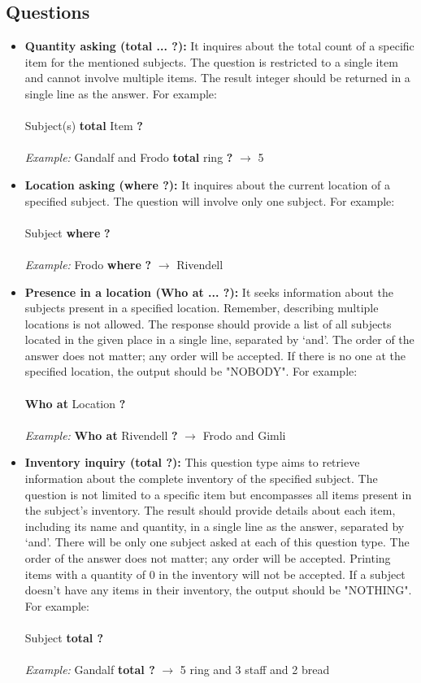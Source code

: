 \documentclass[12pt]{article}
\begin{document}
\subsection{Questions}
\begin{itemize}
    \item \textbf{Quantity asking (total ... ?):} It inquires about the total count of a specific item for the mentioned subjects. The question is restricted to a single item and cannot involve multiple items. The result integer should be returned in a single line as the answer. For example: \\\\
    Subject(s) \textbf{total} Item \textbf{?} \\\\ \textit{Example:} Gandalf and Frodo \textbf{total} ring \textbf{?} $\rightarrow$ 5 
    
\item \textbf{Location asking (where ?):} 
It inquires about the current location of a specified subject. The question will involve only one subject. For example: \\\\
Subject \textbf{where} \textbf{?} \\\\
\textit{Example:} Frodo \textbf{where} \textbf{?} $\rightarrow$ Rivendell 

\item \textbf{Presence in a location (Who at ... ?):} It seeks information about the subjects present in a specified location. Remember, describing multiple locations is not allowed. The response should provide a list of all subjects located in the given place in a single line, separated by `and'. The order of the answer does not matter; any order will be accepted. If there is no one at the specified location, the output should be "NOBODY". For example: \\\\
\textbf{Who at} Location \textbf{?} \\\\
\textit{Example:} \textbf{Who at} Rivendell \textbf{?} $\rightarrow$ Frodo and Gimli 

\item  \textbf{Inventory inquiry (total ?):} This question type aims to retrieve information about the complete inventory of the specified subject. The question is not limited to a specific item but encompasses all items present in the subject's inventory. The result should provide details about each item, including its name and quantity, in a single line as the answer, separated by `and'. There will be only one subject asked at each of this question type. The order of the answer does not matter; any order will be accepted. Printing items with a quantity of 0 in the inventory will not be accepted. If a subject doesn't have any items in their inventory, the output should be "NOTHING". For example: \\\\
Subject \textbf{total ?} \\\\
\textit{Example:} Gandalf \textbf{total ?} $\rightarrow$ 5 ring and 3 staff and 2 bread


\end{itemize}
\end{document}
